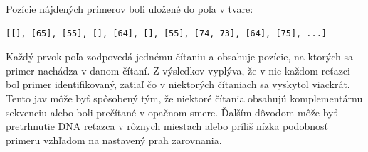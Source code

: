 Pozície nájdených primerov boli uložené do poľa v tvare:
\begin{verbatim}
[[], [65], [55], [], [64], [], [55], [74, 73], [64], [75], ...]
\end{verbatim}

Každý prvok poľa zodpovedá jednému čítaniu a obsahuje pozície, na ktorých sa primer nachádza v danom čítaní. Z výsledkov vyplýva, že v nie každom reťazci bol primer identifikovaný, zatiaľ čo v niektorých čítaniach sa vyskytol viackrát.
Tento jav môže byť spôsobený tým, že niektoré čítania obsahujú komplementárnu sekvenciu alebo boli prečítané v opačnom smere. Ďalším dôvodom môže byť pretrhnutie DNA reťazca v rôznych miestach alebo príliš nízka podobnosť primeru vzhľadom na nastavený prah zarovnania.

